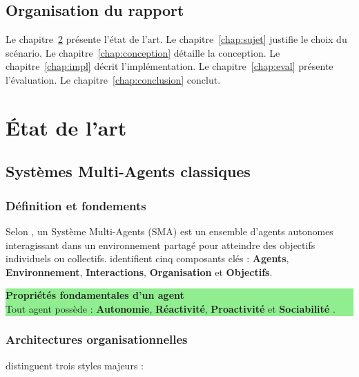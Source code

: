 \documentclass[12pt,a4paper]{report}
\begin{document}
\section{Organisation du rapport}

Le chapitre~\ref{chap:soa} présente l'état de l'art.
Le chapitre~\ref{chap:sujet} justifie le choix du scénario.
Le chapitre~\ref{chap:conception} détaille la conception.
Le chapitre~\ref{chap:impl} décrit l'implémentation.
Le chapitre~\ref{chap:eval} présente l'évaluation.
Le chapitre~\ref{chap:conclusion} conclut.

\chapter{État de l'art}
\label{chap:soa}

\section{Systèmes Multi-Agents classiques}
\label{sec:sma}

\subsection{Définition et fondements}

Selon \citet{dorri2018}, un Système Multi-Agents (SMA) est un ensemble d'agents
autonomes interagissant dans un environnement partagé pour atteindre des objectifs
individuels ou collectifs. \citet{maldonado2024} identifient cinq composants clés :
\textbf{Agents}, \textbf{Environnement}, \textbf{Interactions}, \textbf{Organisation}
et \textbf{Objectifs}.

\medskip
\colorbox{lightgreen}{\parbox{0.95\textwidth}{
\smallskip
\textbf{\color{secondary}Propriétés fondamentales d'un agent}\\
Tout agent possède : \textbf{Autonomie}, \textbf{Réactivité}, \textbf{Proactivité}
et \textbf{Sociabilité} \citep{maldonado2024}.
\smallskip
}}
\medskip

\subsection{Architectures organisationnelles}

\citet{maldonado2024} distinguent trois styles majeurs :
\end{document}
